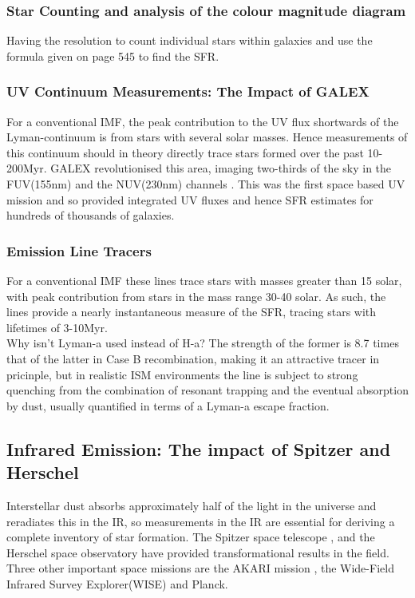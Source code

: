 \documentclass{literature}
\begin{document}
\subsubsection{Star Counting and analysis of the colour magnitude diagram}
Having the resolution to count individual stars within galaxies and use the formula given on page 545 to find the SFR. 
\subsubsection{UV Continuum Measurements: The Impact of GALEX}
For a conventional IMF, the peak contribution to the UV flux shortwards of the Lyman-continuum is from stars with several solar masses. Hence measurements of this continuum should in theory directly trace stars formed over the past 10-200Myr. GALEX revolutionised this area, imaging two-thirds of the sky in the FUV(155nm) and the NUV(230nm) channels \citep{Martin2005}. This was the first space based UV mission and so provided integrated UV fluxes and hence SFR estimates for hundreds of thousands of galaxies. 
\subsubsection{Emission Line Tracers}
For a conventional IMF these lines trace stars with masses greater than 15 solar, with peak contribution from stars in the mass range 30-40 solar. As such, the lines provide a nearly instantaneous measure of the SFR, tracing stars with lifetimes of 3-10Myr. \\ 
Why isn't Lyman-a used instead of H-a? The strength of the former is 8.7 times that of the latter in Case B recombination, making it an attractive tracer in pricinple, but in realistic ISM environments the line is subject to strong quenching from the combination of resonant trapping and the eventual absorption by dust, usually quantified in terms of a Lyman-a escape fraction. 
\subsection{Infrared Emission: The impact of Spitzer and Herschel}
Interstellar dust absorbs approximately half of the light in the universe and reradiates this in the IR, so measurements in the IR are essential for deriving a complete inventory of star formation. The Spitzer space telescope \citep{Gehrz_2007}, \citep{Werner2004} and the Herschel space observatory \citep{Pilbratt2010} have provided transformational results in the field. Three other important space missions are the AKARI mission \citep{Murakami2007a}, the Wide-Field Infrared Survey Explorer(WISE) \cite{Wright2010} and Planck. 
\end{document}
